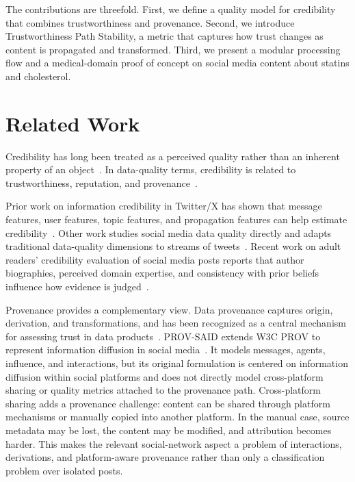 \documentclass[sigconf, nonacm]{acmart}
\begin{document}
The contributions are threefold. First, we define a quality model for credibility
that combines trustworthiness and provenance. Second, we introduce
Trustworthiness Path Stability, a metric that captures how trust changes as
content is propagated and transformed. Third, we present a modular processing
flow and a medical-domain proof of concept on social media content about statins
and cholesterol.

\section{Related Work}

Credibility has long been treated as a perceived quality rather than an inherent
property of an object~\cite{FoggTseng1999}. In data-quality terms, credibility is
related to trustworthiness, reputation, and provenance~\cite{BatiniScannapieco2016}.

Prior work on information credibility in Twitter/X has shown that message
features, user features, topic features, and propagation features can help
estimate credibility~\cite{Castillo2011}. Other work studies social media data
quality directly and adapts traditional data-quality dimensions to streams of
tweets~\cite{Arolfo2020}. Recent work on adult readers' credibility evaluation of
social media posts reports that author biographies, perceived domain expertise,
and consistency with prior beliefs influence how evidence is judged~\cite{Kuutila2024}.

Provenance provides a complementary view. Data provenance captures origin,
derivation, and transformations, and has been recognized as a central mechanism
for assessing trust in data products~\cite{Simmhan2005}. PROV-SAID extends W3C
PROV to represent information diffusion in social media~\cite{Taxidou2015}. It
models messages, agents, influence, and interactions, but its original formulation
is centered on information diffusion within social platforms and does not directly
model cross-platform sharing or quality metrics attached to the provenance path.
Cross-platform sharing adds a provenance challenge: content can be shared through
platform mechanisms or manually copied into another platform. In the manual case,
source metadata may be lost, the content may be modified, and attribution becomes
harder. This makes the relevant social-network aspect a problem of interactions,
derivations, and platform-aware provenance rather than only a classification
problem over isolated posts.
\end{document}
